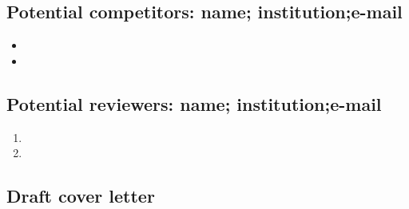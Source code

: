 \documentclass[10pt,letterpaper]{article}
\newcommand{\bi}{\begin{itemize}}
\newcommand{\ei}{\end{itemize}}
\newcommand{\be}{\begin{enumerate}}
\newcommand{\ee}{\end{enumerate}}
\begin{document}
\subsection{Potential competitors: name; institution;e-mail}
\label{sub:competitors}

\bi
\item
\item 
\ei



\subsection{Potential reviewers: name; institution;e-mail}
\label{sub:reviewers}

\be
    \item 
    \item
\ee


\subsection{Draft cover letter}
\label{sub:coverletter}




\end{document}
